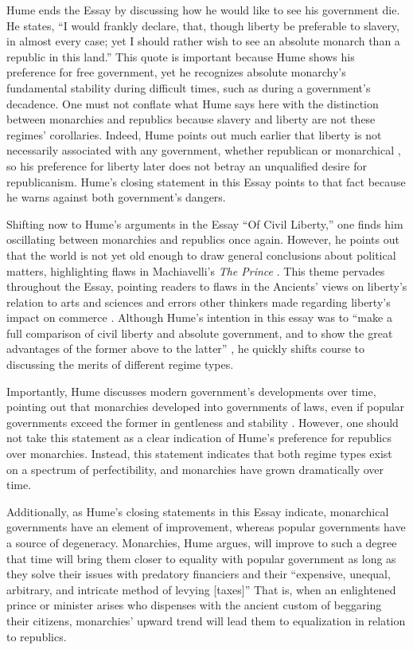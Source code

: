 \documentclass[authordate]{turabian-researchpaper}
\begin{document}
Hume ends the Essay by discussing how he would like to see his government die. He states, “I would frankly declare, that, though liberty be preferable to slavery, in almost every case; yet I should rather wish to see an absolute monarch than a republic in this land.”\autocite[52]{Hume_1985} This quote is important because Hume shows his preference for free government, yet he recognizes absolute monarchy’s fundamental stability during difficult times, such as during a government’s decadence. One must not conflate what Hume says here with the distinction between monarchies and republics because slavery and liberty are not these regimes’ corollaries. Indeed, Hume points out much earlier that liberty is not necessarily associated with any government, whether republican or monarchical \autocite[9-10]{Hume_1985}, so his preference for liberty later does not betray an unqualified desire for republicanism. Hume’s closing statement in this Essay points to that fact because he warns against both government’s dangers.\autocite[53]{Hume_1985}

Shifting now to Hume’s arguments in the Essay “Of Civil Liberty,” one finds him oscillating between monarchies and republics once again. However, he points out that the world is not yet old enough to draw general conclusions about political matters, highlighting flaws in Machiavelli’s \emph{The Prince} \autocite[87-9]{Hume_1985}. This theme pervades throughout the Essay, pointing readers to flaws in the Ancients’ views on liberty’s relation to arts and sciences and errors other thinkers made regarding liberty’s impact on commerce \autocite[89-93]{Hume_1985}. Although Hume’s intention in this essay was to “make a full comparison of civil liberty and absolute government, and to show the great advantages of the former above to the latter” \autocite[89]{Hume_1985}, he quickly shifts course to discussing the merits of different regime types. 

Importantly, Hume discusses modern government’s developments over time, pointing out that monarchies developed into governments of laws, even if popular governments exceed the former in gentleness and stability \autocite[94]{Hume_1985}. However, one should not take this statement as a clear indication of Hume’s preference for republics over monarchies. Instead, this statement indicates that both regime types exist on a spectrum of perfectibility, and monarchies have grown dramatically over time.

Additionally, as Hume’s closing statements in this Essay indicate, monarchical governments have an element of improvement, whereas popular governments have a source of degeneracy.\autocite[95-6]{Hume_1985} Monarchies, Hume argues, will improve to such a degree that time will bring them closer to equality with popular government as long as they solve their issues with predatory financiers and their “expensive, unequal, arbitrary, and intricate method of levying [taxes]” \autocite[95]{Hume_1985} That is, when an enlightened prince or minister arises who dispenses with the ancient custom of beggaring their citizens, monarchies’ upward trend will lead them to equalization in relation to republics. 
\end{document}
